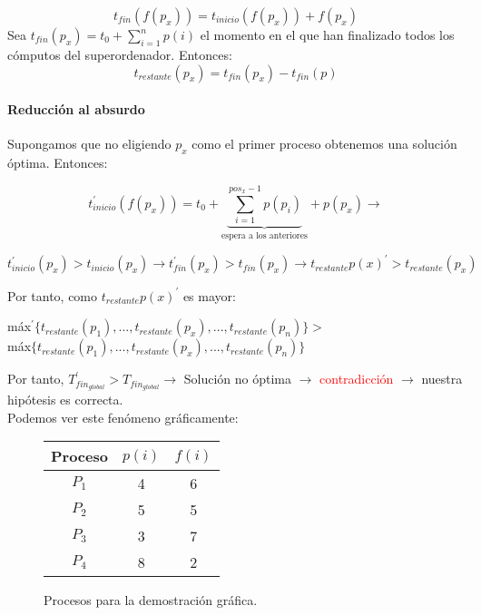 \documentclass[12pt,spanish]{article}
\begin{document}
\begin{equation*}
	t_{fin}(f(p_x))= t_{inicio}(f(p_x)) + f(p_x)
\end{equation*}
Sea $t_{fin}(p_x)=t_0 + \sum^{n}_{i=1}p(i)$ el momento en el que han finalizado todos los cómputos del superordenador. Entonces:
\begin{equation*}
	t_{restante}(p_x)=t_{fin}(p_x) - t_{fin}(p)
\end{equation*}
\paragraph{Reducción al absurdo}
Supongamos que no eligiendo $p_x$ como el primer proceso obtenemos una solución óptima. Entonces:

\begin{equation*}
	t_{inicio}^{\prime}(f(p_x))= t_0 + \underbrace{\sum^{pos_x-1}_{i=1} p(p_i)}_{\text{espera a los anteriores}} + p(p_x) \rightarrow 
\end{equation*}
	
\begin{equation*}
 t_{inicio}^{\prime}(p_x) > t_{inicio}(p_x) \rightarrow 
	t_{fin}^{\prime}(p_x) > t_{fin}(p_x) \rightarrow t_{restante}p(x)^{\prime} > t_{restante}(p_x)
\end{equation*}

Por tanto, como $t_{restante}p(x)^{\prime}$ es mayor:
\begin{center}
máx$^{\prime}\{t_{restante}(p_1),...,t_{restante}(p_x),...,t_{restante}(p_n)\} > $ \\máx$\{t_{restante}(p_1),...,t_{restante}(p_x),...,t_{restante}(p_n)\}$
\end{center}
Por tanto, $T_{fin_{global}}^{\prime}> T_{fin_{global}} \rightarrow $ Solución no óptima $\rightarrow$ \textcolor{red}{contradicción} $\rightarrow$ nuestra hipótesis es correcta.\\
Podemos ver este fenómeno gráficamente:
\begin{figure}[H]
\centering
\begin{tabular}{|c|c|c|}
\hline
\textbf{Proceso} & \textbf{$p(i)$} & \textbf{$f(i)$} \\
\hline
$P_1$ & 4 & 6 \\
\hline
$P_2$ & 5 & 5 \\
\hline
$P_3$ & 3 & 7 \\
\hline
$P_4$ & 8 & 2 \\
\hline
\end{tabular}
\caption{Procesos para la demostración gráfica.}
\end{figure}
\end{document}
